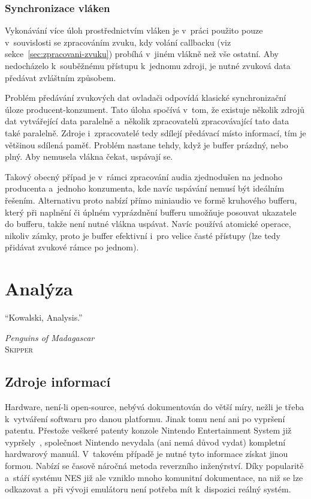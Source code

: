 \subsection{Synchronizace vláken}
Vykonávání více úloh prostřednictvím vláken je v~práci použito pouze v~souvislosti se zpracováním zvuku, kdy volání callbacku (viz sekce~\ref{sec:zpracovani-zvuku}) probíhá v~jiném vlákně než vše ostatní. Aby nedocházelo k~souběžnému přístupu k~jednomu zdroji, je nutné zvuková data předávat zvláštním způsobem.

Problém předávání zvukových dat ovladači odpovídá klasické synchronizační úloze producent-konzument. Tato úloha spočívá v~tom, že existuje několik zdrojů dat vytvářející data paralelně a~několik zpracovatelů zpracovávající tato data také paralelně. Zdroje i~zpracovatelé tedy sdílejí předávací místo informací, tím je většinou sdílená paměť. Problém nastane tehdy, když je buffer prázdný, nebo plný. Aby nemusela vlákna čekat, uspávají se.~\cite{Tanenbaum2015:os}

Takový obecný případ je v~rámci zpracování audia zjednodušen na jednoho producenta a~jednoho konzumenta, kde navíc uspávání nemusí být ideálním řešením. Alternativu proto nabízí přímo miniaudio ve formě kruhového bufferu, který při naplnění či úplném vyprázdnění bufferu umožňuje posouvat ukazatele do bufferu, takže není nutné vlákna uspávat.  Navíc používá atomické operace, nikoliv zámky, proto je buffer efektivní i~pro velice časté přístupy (lze tedy přidávat zvukové rámce po jednom).~\cite{Reid2023:miniaudio}

\chapter{Analýza}
\epigraph{
	\enquote{Kowalski, Analysis.}
}{\textit{Penguins of Madagascar}\\ \textsc{Skipper}}

\section{Zdroje informací}
Hardware, není-li open-source, nebývá dokumentován do větší míry, nežli je třeba k~vytváření softwaru pro danou platformu. Jinak tomu není ani po vypršení patentu. Přestože veškeré patenty konzole Nintendo Entertainment System již vypršely~\cite{Nesdev:patents}, společnost Nintendo nevydala (ani nemá důvod vydat) kompletní hardwarový manuál. V~takovém případě je nutné tyto informace získat jinou formou. Nabízí se časově náročná metoda reverzního inženýrství. Díky popularitě a~stáří systému NES již ale vzniklo mnoho komunitní dokumentace, na niž se lze odkazovat a~při vývoji emulátoru není potřeba mít k~dispozici reálný systém.

